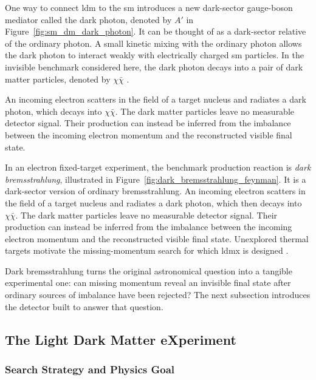 One way to connect \gls{ldm} to the \gls{sm} introduces
a new dark-sector gauge-boson mediator called the \gls{dark photon}, denoted by \(A'\) in
Figure~\ref{fig:sm_dm_dark_photon}. It can be
thought of as a dark-sector relative of the ordinary photon. A small kinetic mixing with the ordinary
photon allows the dark photon to interact weakly with electrically charged
\gls{sm} particles. In the invisible benchmark considered here, the dark
photon decays into a pair of dark matter particles, denoted by
\(\chi\bar{\chi}\)
\cite{cirelli2026-darkmatter,ldmx2025-overview}.


An incoming electron scatters in the field of a target nucleus and radiates a
dark photon, which decays into \(\chi\bar{\chi}\). The dark matter particles
leave no measurable detector signal. Their production can instead be inferred
from the imbalance between the incoming electron momentum and the reconstructed
visible final state.


In an electron fixed-target experiment, the benchmark production reaction is
\emph{dark bremsstrahlung}, illustrated in
Figure~\ref{fig:dark_bremsstrahlung_feynman}. It is a dark-sector version of
ordinary bremsstrahlung. An incoming electron scatters in the field of a target
nucleus and radiates a dark photon, which then decays into
\(\chi\bar{\chi}\). The dark matter particles leave no measurable detector
signal. Their production can instead be inferred from the imbalance between
the incoming electron momentum and the reconstructed visible final state.
Unexplored thermal targets motivate the missing-momentum search for which
\gls{ldmx} is designed
\cite{akesson2018-ldmx,ldmx2025-overview}.

Dark bremsstrahlung turns the original astronomical question into a tangible
experimental one: can missing momentum reveal an invisible final state after
ordinary sources of imbalance have been rejected? The next subsection
introduces the detector built to answer that question.





\subsection{The Light Dark Matter eXperiment}
\label{sec:ldmx}

\subsubsection{Search Strategy and Physics Goal}


